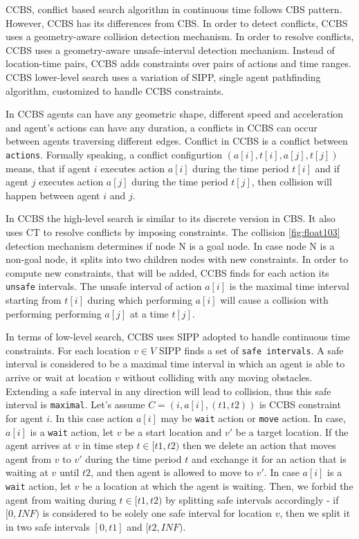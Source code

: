\documentclass[thesis=B,english]{FITthesis}[2019/12/23]
\begin{document}
CCBS, conflict based search algorithm in continuous time follows CBS pattern. However,
CCBS has its differences from CBS. In order to detect conflicts, CCBS uses a geometry-aware
collision detection mechanism. In order to resolve conflicts, CCBS uses a geometry-aware unsafe-interval detection mechanism. Instead of location-time pairs, CCBS adds constraints 
over pairs of actions and time ranges. CCBS lower-level search uses a variation of SIPP, single agent pathfinding algorithm, customized to handle CCBS constraints.

In CCBS agents can have any geometric shape, different speed and acceleration and agent's actions can have any duration, a conflicts in CCBS can occur between agents traversing different edges. Conflict in CCBS is a conflict between \verb|actions|. Formally speaking, a conflict configurtion $(a[i], t[i], a[j], t[j])$ means, that if agent $i$ executes action $a[i]$ during the time period $t[i]$ and if agent $j$ executes action $a[j]$ during the time period $t[j]$, then collision will happen between agent $i$ and $j$.

In CCBS the high-level search is similar to its discrete version in CBS. It also uses CT to resolve conflicts by imposing constraints. The collision \ref{fig:float103} detection mechanism determines if node N is a goal node. In case node N is a non-goal node, it splits into two children nodes with new constraints. In order to compute new constraints, that will be added, CCBS finds for each action its \verb|unsafe| intervals. The unsafe interval of action $a[i]$ is the maximal time interval starting from $t[i]$ during which performing $a[i]$ will cause a collision with performing performing $a[j]$ at a time $t[j]$. 

In terms of low-level search, CCBS uses SIPP adopted to handle continuous time constraints.
For each location $v \in V$ SIPP finds a set of \verb|safe intervals|. A safe interval is considered to be a maximal time interval in which an agent is able to arrive or wait at location $v$ without colliding with any moving obstacles. Extending a safe interval in any direction will lead to collision, thus this safe interval is \verb|maximal|. Let's assume 
$C = (i, a[i], (t1, t2))$ is CCBS constraint for agent $i$. In this case action $a[i]$ may be \verb|wait| action or \verb|move| action. In case, $a[i]$ is a \verb|wait| action, let
$v$ be a start location and $v'$ be a target location. If the agent arrives at $v$ in time step $t \in [t1, t2)$ then we delete an action that moves agent from $v$ to $v'$ during the time period $t$ and exchange it for an action that is waiting at $v$ until $t2$, and then agent is allowed to move to $v'$. In case $a[i]$ is a \verb|wait| action, let $v$ be a location at which the agent is waiting. Then, we forbid the agent from waiting during $t \in [t1, t2)$ by splitting safe intervals accordingly - if $[0, INF)$ is considered to be solely one safe interval for location $v$, then we split it in two safe intervals $[0, t1]$ and $[t2, INF)$.\cite{bib_2}
\end{document}
